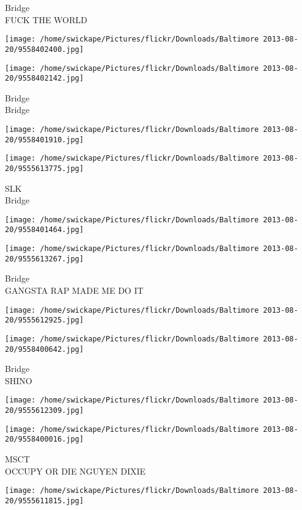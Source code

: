 \documentclass[10pt,letterpaper]{article}
\begin{document}
Bridge\\
FUCK THE WORLD
\pagebreak

\texttt{[image: /home/swickape/Pictures/flickr/Downloads/Baltimore 2013-08-20/9558402400.jpg]}

\vspace{0.25in}
\texttt{[image: /home/swickape/Pictures/flickr/Downloads/Baltimore 2013-08-20/9558402142.jpg]}

Bridge\\
Bridge
\pagebreak

\texttt{[image: /home/swickape/Pictures/flickr/Downloads/Baltimore 2013-08-20/9558401910.jpg]}

\vspace{0.25in}
\texttt{[image: /home/swickape/Pictures/flickr/Downloads/Baltimore 2013-08-20/9555613775.jpg]}

SLK\\
Bridge
\pagebreak

\texttt{[image: /home/swickape/Pictures/flickr/Downloads/Baltimore 2013-08-20/9558401464.jpg]}

\vspace{0.25in}
\texttt{[image: /home/swickape/Pictures/flickr/Downloads/Baltimore 2013-08-20/9555613267.jpg]}

Bridge\\
GANGSTA RAP MADE ME DO IT
\pagebreak

\texttt{[image: /home/swickape/Pictures/flickr/Downloads/Baltimore 2013-08-20/9555612925.jpg]}

\vspace{0.25in}
\texttt{[image: /home/swickape/Pictures/flickr/Downloads/Baltimore 2013-08-20/9558400642.jpg]}

Bridge\\
SHINO
\pagebreak

\texttt{[image: /home/swickape/Pictures/flickr/Downloads/Baltimore 2013-08-20/9555612309.jpg]}

\vspace{0.25in}
\texttt{[image: /home/swickape/Pictures/flickr/Downloads/Baltimore 2013-08-20/9558400016.jpg]}

MSCT\\
OCCUPY OR DIE NGUYEN DIXIE
\pagebreak

\texttt{[image: /home/swickape/Pictures/flickr/Downloads/Baltimore 2013-08-20/9555611815.jpg]}
\end{document}
